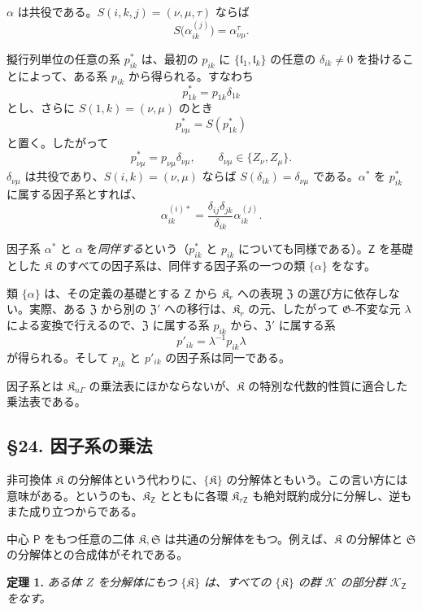 \(\alpha\) は共役である。\(S(i,k,j)=(\nu,\mu,\tau)\) ならば
\[
S\bigl(\alpha_{ik}^{(j)}\bigr)=\alpha_{\nu\mu}^{\tau}.
\]

擬行列単位の任意の系 \(p_{ik}^*\) は、最初の \(p_{ik}\) に \(\{\mathfrak l_1,\mathfrak l_k\}\) の任意の \(\delta_{ik}\ne0\) を掛けることによって、ある系 \(p_{ik}\) から得られる。すなわち
\[
p_{1k}^*=p_{1k}\delta_{1k}
\]
とし、さらに \(S(1,k)=(\nu,\mu)\) のとき
\[
p_{\nu\mu}^*=S(p_{1k}^*)
\]
と置く。したがって
\[
p_{\nu\mu}^*=p_{\nu\mu}\delta_{\nu\mu},
\qquad \delta_{\nu\mu}\in\{Z_\nu,Z_\mu\}.
\]
\(\delta_{\nu\mu}\) は共役であり、\(S(i,k)=(\nu,\mu)\) ならば \(S(\delta_{ik})=\delta_{\nu\mu}\) である。\(\alpha^*\) を \(p_{ik}^*\) に属する因子系とすれば、
\[
\alpha_{ik}^{(i)*}=\frac{\delta_{ij}\delta_{jk}}{\delta_{ik}}\alpha_{ik}^{(j)}.
\]

因子系 \(\alpha^*\) と \(\alpha\) を\emph{同伴する}という（\(p_{ik}^*\) と \(p_{ik}\) についても同様である）。\(\mathsf{Z}\) を基礎とした \(\mathfrak K\) のすべての因子系は、同伴する因子系の一つの類 \(\{\alpha\}\) をなす。

類 \(\{\alpha\}\) は、その定義の基礎とする \(\mathsf{Z}\) から \(\mathfrak K_r\) への表現 \(\mathfrak Z\) の選び方に依存しない。実際、ある \(\mathfrak Z\) から別の \(\mathfrak Z'\) への移行は、\(\mathfrak K_r\) の元、したがって \(\mathfrak G\)-不変な元 \(\lambda\) による変換で行えるので、\(\mathfrak Z\) に属する系 \(p_{ik}\) から、\(\mathfrak Z'\) に属する系
\[
p'_{ik}=\lambda^{-1}p_{ik}\lambda
\]
が得られる。そして \(p_{ik}\) と \(p'_{ik}\) の因子系は同一である。

因子系とは \(\mathfrak K_{n\Gamma}\) の乗法表にほかならないが、\(\mathfrak K\) の特別な代数的性質に適合した乗法表である。

\subsection*{\S 24. 因子系の乗法}\label{multiplikation-von-faktorensystemen}

非可換体 \(\mathfrak K\) の分解体という代わりに、\(\{\mathfrak K\}\) の分解体ともいう。この言い方には意味がある。というのも、\(\mathfrak K_{\mathsf{Z}}\) とともに各環 \(\mathfrak K_{r\mathsf{Z}}\) も絶対既約成分に分解し、逆もまた成り立つからである。

中心 \(\mathsf P\) をもつ任意の二体 \(\mathfrak K,\mathfrak S\) は共通の分解体をもつ。例えば、\(\mathfrak K\) の分解体と \(\mathfrak S\) の分解体との合成体がそれである。

\textbf{定理 1.} \emph{ある体 \(Z\) を分解体にもつ \(\{\mathfrak K\}\) は、すべての \(\{\mathfrak K\}\) の群 \(\mathscr K\) の部分群 \(\mathscr K_{\mathsf{Z}}\) をなす。}

